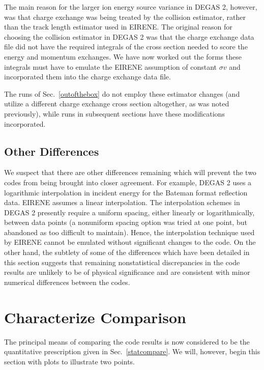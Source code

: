 \documentclass[12pt]{report}
\begin{document}
The main reason for the larger ion energy source variance in DEGAS 2,
however, was that charge exchange was being treated by the collision
estimator, rather than the track length estimator used in EIRENE. 
The original reason for choosing the collision estimator in DEGAS 2
was that the charge exchange data file did not have the required
integrals of the cross section needed to score the energy and momentum
exchanges\cite{Reit93}. We have now worked out the forms these
integrals must have to emulate the EIRENE assumption of constant
$\sigma v$ and incorporated them into the charge exchange data file.

The runs of Sec.~\ref{outofthebox} do not employ these estimator
changes (and utilize a different charge exchange cross section
altogether, as was noted previously), while runs in subsequent
sections have these modifications incorporated.

\subsection{Other Differences}
\label{otherdiffs}

We suspect that there are other differences remaining which will prevent
the two codes from being brought into closer agreement. For example,
DEGAS 2 uses a logarithmic interpolation in incident energy for the
Bateman format reflection data. EIRENE assumes a linear interpolation. 
The interpolation schemes in DEGAS 2 presently require a uniform
spacing, either linearly or logarithmically, between data points 
(a nonuniform spacing option was tried at one point, but abandoned
as too difficult to maintain). Hence, the interpolation technique
used by EIRENE cannot be emulated without significant changes to the
code. On the other hand, the subtlety of some of the differences which have
been detailed in this section suggests that remaining nonstatistical
discrepancies in the code results are unlikely to be of physical
significance and are consistent with minor numerical differences
between the codes.

\section{Characterize Comparison}

The principal means of comparing the code results is now considered to
be the quantitative prescription given in Sec.~\ref{statcompare}.
We will, however, begin this section with plots to illustrate two
points.
\end{document}
